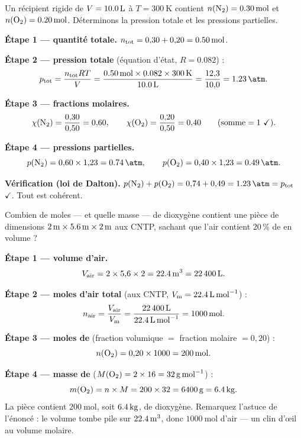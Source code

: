 \documentclass[11pt,a4paper]{article}
\newcommand{\Vm}{V_{\mathrm{m}}}
\begin{document}
\begin{exemple}
Un récipient rigide de $V=\qty{10{,}0}{\litre}$ à $T=\qty{300}{\kelvin}$ contient
$n(\ce{N2})=\qty{0{,}30}{\mole}$ et $n(\ce{O2})=\qty{0{,}20}{\mole}$. Déterminons la pression totale et
les pressions partielles.

\smallskip
\textbf{Étape 1 — quantité totale.}
$n_{\text{tot}}=0{,}30+0{,}20=\qty{0{,}50}{\mole}$.

\textbf{Étape 2 — pression totale} (équation d'état, $R=\num{0,082}$) :
\[ p_{\text{tot}}=\frac{n_{\text{tot}}RT}{V}
   =\frac{\qty{0{,}50}{\mole}\times\num{0,082}\times\qty{300}{\kelvin}}{\qty{10{,}0}{\litre}}
   =\frac{12{,}3}{10{,}0}=\qty{1{,}23}{\atm}. \]

\textbf{Étape 3 — fractions molaires.}
\[ \chi(\ce{N2})=\frac{0{,}30}{0{,}50}=0{,}60,\qquad \chi(\ce{O2})=\frac{0{,}20}{0{,}50}=0{,}40
   \qquad(\text{somme}=1\ \checkmark). \]

\textbf{Étape 4 — pressions partielles.}
\[ p(\ce{N2})=0{,}60\times1{,}23=\qty{0{,}74}{\atm},\qquad
   p(\ce{O2})=0{,}40\times1{,}23=\qty{0{,}49}{\atm}. \]

\textbf{Vérification (loi de Dalton).}
$p(\ce{N2})+p(\ce{O2})=0{,}74+0{,}49=\qty{1{,}23}{\atm}=p_{\text{tot}}$ $\checkmark$. Tout est
cohérent.
\end{exemple}

\begin{exemple}
Combien de moles — et quelle masse — de dioxygène  contient une pièce de dimensions
$\qty{2}{\meter}\times\qty{5{,}6}{\meter}\times\qty{2}{\meter}$ aux CNTP, sachant que l'air contient
$20\,\%$ de  en volume ?

\smallskip
\textbf{Étape 1 — volume d'air.}
\[ V_{\text{air}}=2\times5{,}6\times2=\qty{22{,}4}{\meter\cubed}=\qty{22400}{\litre}. \]

\textbf{Étape 2 — moles d'air total} (aux CNTP, $\Vm=\qty{22{,}4}{\litre\per\mole}$) :
\[ n_{\text{air}}=\frac{V_{\text{air}}}{\Vm}=\frac{\qty{22400}{\litre}}{\qty{22{,}4}{\litre\per\mole}}
   =\qty{1000}{\mole}. \]

\textbf{Étape 3 — moles de } (fraction volumique $=$ fraction molaire $=0{,}20$) :
\[ n(\ce{O2})=0{,}20\times1000=\qty{200}{\mole}. \]

\textbf{Étape 4 — masse de } ($M(\ce{O2})=2\times16=\qty{32}{\gram\per\mole}$) :
\[ m(\ce{O2})=n\times M=200\times32=\qty{6400}{\gram}=\qty{6{,}4}{\kilo\gram}. \]
La pièce contient $\qty{200}{\mole}$, soit $\qty{6{,}4}{\kilo\gram}$, de dioxygène. Remarquez l'astuce
de l'énoncé : le volume tombe pile sur $\qty{22{,}4}{\meter\cubed}$, donc $\qty{1000}{\mole}$ d'air —
un clin d'œil au volume molaire.
\end{exemple}
\end{document}

